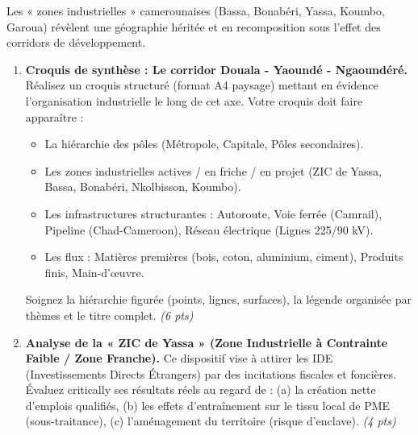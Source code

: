 \documentclass[11pt]{article}
\begin{document}
\begin{exercice}
Les « zones industrielles » camerounaises (Bassa, Bonabéri, Yassa, Koumbo, Garoua) révèlent une géographie héritée et en recomposition sous l'effet des corridors de développement.

\begin{enumerate}
    \item \textbf{Croquis de synthèse : Le corridor Douala - Yaoundé - Ngaoundéré.} Réalisez un croquis structuré (format A4 paysage) mettant en évidence l'organisation industrielle le long de cet axe. Votre croquis doit faire apparaître :
    \begin{itemize}
        \item La hiérarchie des pôles (Métropole, Capitale, Pôles secondaires).
        \item Les zones industrielles actives / en friche / en projet (ZIC de Yassa, Bassa, Bonabéri, Nkolbisson, Koumbo).
        \item Les infrastructures structurantes : Autoroute, Voie ferrée (Camrail), Pipeline (Chad-Cameroon), Réseau électrique (Lignes 225/90 kV).
        \item Les flux : Matières premières (bois, coton, aluminium, ciment), Produits finis, Main-d'œuvre.
    \end{itemize}
    Soignez la hiérarchie figurée (points, lignes, surfaces), la légende organisée par thèmes et le titre complet. \textit{(6 pts)}

    \item \textbf{Analyse de la « ZIC de Yassa » (Zone Industrielle à Contrainte Faible / Zone Franche).} Ce dispositif vise à attirer les IDE (Investissements Directs Étrangers) par des incitations fiscales et foncières. Évaluez critically ses résultats réels au regard de : (a) la création nette d'emplois qualifiés, (b) les effets d'entraînement sur le tissu local de PME (sous-traitance), (c) l'aménagement du territoire (risque d'enclave). \textit{(4 pts)}
\end{enumerate}
\end{exercice}
\end{document}
